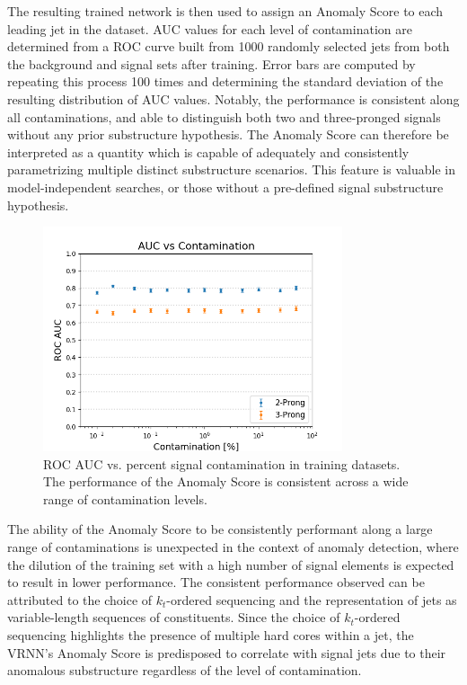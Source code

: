 \documentclass[11pt, a4paper]{article}
\begin{document}
The resulting trained network is then used to assign an Anomaly Score to each leading jet in the dataset. 
AUC values for each level of contamination are determined from a ROC curve built from 1000 randomly selected jets from both the background and signal sets after training.
Error bars are computed by repeating this process 100 times and determining the standard deviation of the resulting distribution of AUC values.
Notably, the performance is consistent along all contaminations, and able to distinguish both two and three-pronged signals without any prior substructure hypothesis. 
The Anomaly Score can therefore be interpreted as a quantity which is capable of adequately and consistently parametrizing multiple distinct substructure scenarios. 
This feature is valuable in model-independent searches, or those without a pre-defined signal substructure hypothesis. 

\begin{figure}[H]
	\begin{center}
		\includegraphics[width=250pt]{imgs/bugfix/AUC_vs_Contam_Lead_SaveForPaper.png}
	\end{center}
	\caption{ROC AUC vs. percent signal contamination in training datasets. The performance of the Anomaly Score is consistent across a wide range of contamination levels.}
	\label{fig:aucs_vs_contam}
\end{figure}


The ability of the Anomaly Score to be consistently performant along a large range of contaminations is unexpected in the context of anomaly detection, where the dilution of the training set with a high number of signal elements is expected to result in lower performance.
The consistent performance observed can be attributed to the choice of $k_t$-ordered sequencing and the representation of jets as variable-length sequences of constituents. Since the choice of $k_t$-ordered sequencing highlights the presence of multiple hard cores within a jet, the VRNN's Anomaly Score is predisposed to correlate with signal jets due to their anomalous substructure regardless of the level of contamination.
\end{document}
